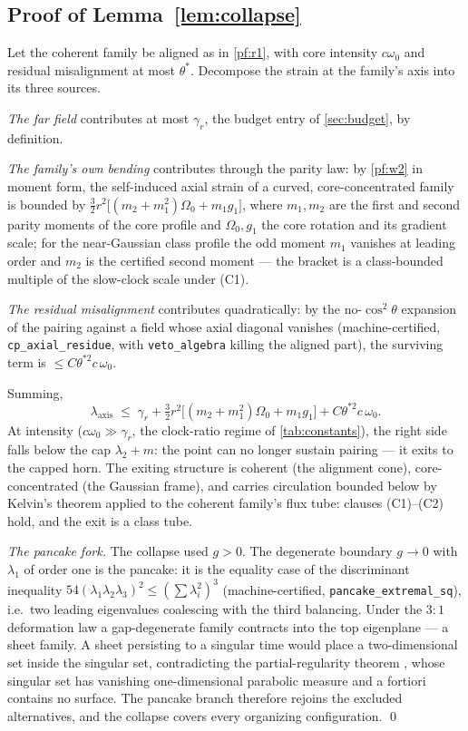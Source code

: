 \documentclass[11pt,letterpaper]{amsart}
\theoremstyle{definition}
\theoremstyle{remark}
\newcommand{\om}{\omega}
\begin{document}
\subsection{Proof of Lemma~\ref{lem:collapse}}\label{pf:collapse}
Let the coherent family be aligned as in \cref{pf:r1}, with core intensity $c\om_0$
and residual misalignment at most $\theta^*$. Decompose the strain at the family's
axis into its three sources.

\emph{The far field} contributes at most $\gamma_r$, the budget entry of
\cref{sec:budget}, by definition.

\emph{The family's own bending} contributes through the parity law: by
\cref{pf:w2} in moment form, the self-induced axial strain of a curved,
core-concentrated family is bounded by
$\tfrac32r^2\bigl[(m_2+m_1^2)\Omega_0+m_1g_1\bigr]$, where $m_1,m_2$ are the first
and second parity moments of the core profile and $\Omega_0,g_1$ the core rotation
and its gradient scale; for the near-Gaussian class profile the odd moment $m_1$
vanishes at leading order and $m_2$ is the certified second moment --- the bracket is
a class-bounded multiple of the slow-clock scale under (C1).

\emph{The residual misalignment} contributes quadratically: by the no-$\cos^2\theta$
expansion of the pairing against a field whose axial diagonal vanishes
(machine-certified, \texttt{cp\_axial\_residue}, with
\texttt{veto\_algebra} killing the aligned part), the surviving term is
$\le C\theta^{*2}c\,\om_0$.

Summing,
\[
\lambda_{\mathrm{axis}}\;\le\;\gamma_r
+\tfrac32r^2\bigl[(m_2+m_1^2)\Omega_0+m_1g_1\bigr]+C\theta^{*2}c\,\om_0 .
\]
At intensity ($c\om_0\gg\gamma_r$, the clock-ratio regime of
\cref{tab:constants}), the right side falls below the cap $\lambda_2+m$: the point
can no longer sustain pairing --- it exits to the capped horn. The exiting structure
is coherent (the alignment cone), core-concentrated (the Gaussian frame), and carries
circulation bounded below by Kelvin's theorem applied to the coherent family's flux
tube: clauses (C1)--(C2) hold, and the exit is a class tube.

\emph{The pancake fork.} The collapse used $g>0$. The degenerate boundary $g\to0$
with $\lambda_1$ of order one is the pancake: it is the equality case of the
discriminant inequality $54(\lambda_1\lambda_2\lambda_3)^2\le(\sum\lambda_i^2)^3$
(machine-certified, \texttt{pancake\_extremal\_sq}), i.e.\ two leading eigenvalues
coalescing with the third balancing. Under the $3{:}1$ deformation law a
gap-degenerate family contracts into the top eigenplane --- a sheet family. A sheet
persisting to a singular time would place a two-dimensional set inside the singular
set, contradicting the partial-regularity theorem \cite{CKN1982,Lin1998}, whose
singular set has vanishing one-dimensional parabolic measure and a fortiori contains
no surface. The pancake branch therefore rejoins the excluded alternatives, and the
collapse covers every organizing configuration. \qed
\end{document}
